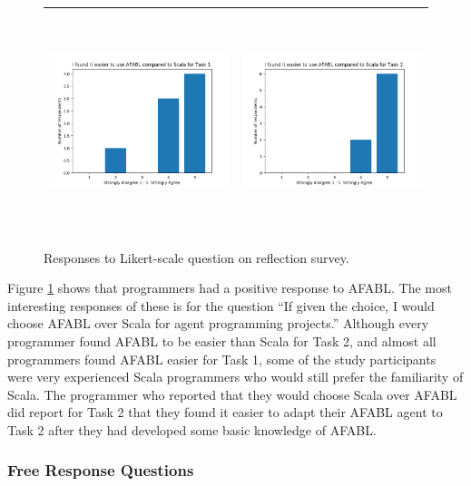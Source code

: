 \begin{figure}[h!]
\begin{tabular}{cc}
  \includegraphics[height=2.5in]{afabl-easier-task1.png} & \includegraphics[height=2.5in]{afabl-easier-task2.png} \\\hline
\end{tabular}
\caption{Responses to Likert-scale question on reflection survey.}
\label{fig:likert-responses}
\end{figure}

Figure \ref{fig:likert-responses} shows that programmers had a positive response to AFABL. The most interesting responses of these is for the question ``If given the choice, I would choose AFABL over Scala for agent programming projects.'' Although every programmer found AFABL to be easier than Scala for Task 2, and almost all programmers found AFABL easier for Task 1, some of the study participants were very experienced Scala programmers who would still prefer the familiarity of Scala. The programmer who reported that they would choose Scala over AFABL did report for Task 2 that they found it easier to adapt their AFABL agent to Task 2 after they had developed some basic knowledge of AFABL.

\subsubsection{Free Response Questions}

